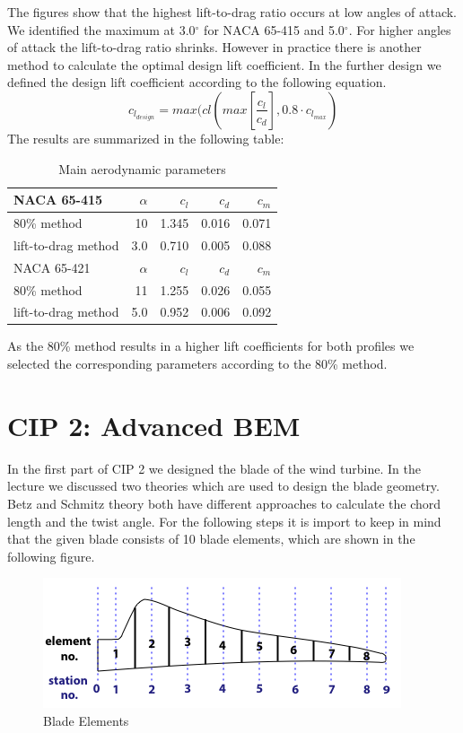 \documentclass[10pt]{article}
\begin{document}
The figures show that the highest lift-to-drag ratio occurs at low angles of attack. We identified the maximum at 3.0$^\circ$ for NACA 65-415 and 5.0$^\circ$. For higher angles of attack the lift-to-drag ratio shrinks. However in practice there is another method to calculate the optimal design lift coefficient. In the further design we defined the design lift coefficient according to the following equation.
\begin{equation}
c_{l_{design}} = max(cl(max[\frac{c_l}{c_d}], 0.8\cdot c_{l_{max}})
\end{equation}
The results are summarized in the following table:\\
\begin{table}[H]
\begin{tabular}{l | r r r r}
NACA 65-415 & $\alpha$ &$c_l$ &$c_d$ & $c_m$\\
\hline
80\% method& 10 & 1.345 & 0.016 & 0.071\\
lift-to-drag method & 3.0 & 0.710 & 0.005 &  0.088\\
\hline
NACA 65-421 & $\alpha$ &$c_l$ &$c_d$ & $c_m$\\
\hline
80\% method& 11 & 1.255 & 0.026 & 0.055\\
lift-to-drag method & 5.0 & 0.952 & 0.006 &  0.092\\
\end{tabular}
\caption{Main aerodynamic parameters}
\end{table}

As the 80\% method results in a higher lift coefficients for both profiles we selected the corresponding parameters according to the 80\% method.
\newpage
\section{CIP 2: Advanced BEM }
In the first part of CIP 2 we designed the blade of the wind turbine. In the lecture we discussed two theories which are used to design the blade geometry. Betz and Schmitz theory both have different approaches to calculate the chord length and the twist angle. For the following steps it is import to keep in mind that the given blade consists of 10 blade elements, which are shown in the following figure.
\begin{figure}[H]
\includegraphics[width=1\linewidth]{../CIP_2/Figures/blade_elements.png}
\caption{Blade Elements}
\label{fig:blade_elemets}
\end{figure}
\end{document}
